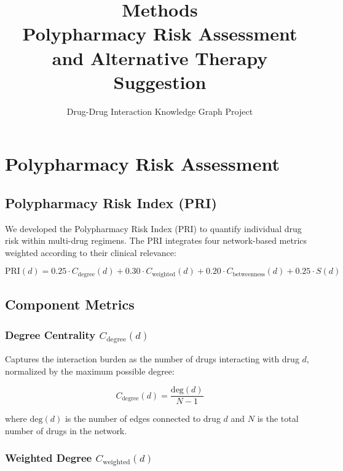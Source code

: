 \documentclass[11pt,a4paper]{article}
\title{\textbf{Methods}\\
\large Polypharmacy Risk Assessment and Alternative Therapy Suggestion}
\author{Drug-Drug Interaction Knowledge Graph Project}
\date{}
\begin{document}
\maketitle

\tableofcontents
\newpage

\section{Polypharmacy Risk Assessment}

\subsection{Polypharmacy Risk Index (PRI)}

We developed the Polypharmacy Risk Index (PRI) to quantify individual drug risk within multi-drug regimens. The PRI integrates four network-based metrics weighted according to their clinical relevance:

\begin{equation}
\text{PRI}(d) = 0.25 \cdot C_{\text{degree}}(d) + 0.30 \cdot C_{\text{weighted}}(d) + 0.20 \cdot C_{\text{betweenness}}(d) + 0.25 \cdot S(d)
\label{eq:pri}
\end{equation}

\subsection{Component Metrics}

\subsubsection{Degree Centrality $C_{\text{degree}}(d)$}

Captures the interaction burden as the number of drugs interacting with drug $d$, normalized by the maximum possible degree:

\begin{equation}
C_{\text{degree}}(d) = \frac{\text{deg}(d)}{N - 1}
\end{equation}

where $\text{deg}(d)$ is the number of edges connected to drug $d$ and $N$ is the total number of drugs in the network.

\subsubsection{Weighted Degree $C_{\text{weighted}}(d)$}
\end{document}
